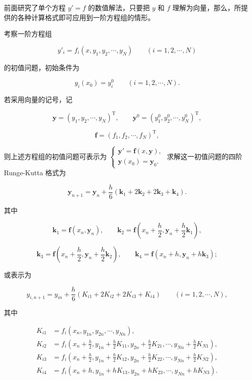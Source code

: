 \documentclass[
  10pt,
  fontset=fandol]{ctexart}
\begin{document}
前面研究了单个方程 \(y'=f\) 的数值解法，只要把 \(y\) 和 \(f\) 理解为向量，那么，所提供的各种计算格式即可应用到一阶方程组的情形。

考察一阶方程组

\[
y'_i=f_i(x,y_1,y_2,\cdots,y_N)\qquad(i=1,2,\cdots,N)
\]

的初值问题，初始条件为

\[
y_i(x_0)=y_i^0\qquad(i=1,2,\cdots,N).
\]

若采用向量的记号，记

\[
\boldsymbol y=(y_1,y_2,\cdots,y_N)^{\mathrm T},\qquad
\boldsymbol y^0=(y_1^0,y_2^0,\cdots,y_N^0)^{\mathrm T},
\]

\[
\boldsymbol f=(f_1,f_2,\cdots,f_N)^{\mathrm T},
\]

则上述方程组的初值问题可表示为 \(\begin{cases}\boldsymbol y'=\boldsymbol f(x,\boldsymbol y),\\\boldsymbol y(x_0)=\boldsymbol y_0.\end{cases}\) 求解这一初值问题的四阶 Runge-Kutta 格式为

\[
\boldsymbol y_{n+1}=\boldsymbol y_n+\frac h6(\boldsymbol k_1+2\boldsymbol k_2+2\boldsymbol k_3+\boldsymbol k_4).
\]

其中

\[
\boldsymbol k_1=\boldsymbol f(x_n,\boldsymbol y_n),\qquad
\boldsymbol k_2=\boldsymbol f\left(x_n+\frac h2,\boldsymbol y_n+\frac h2\boldsymbol k_1\right),
\]

\[
\boldsymbol k_3=\boldsymbol f\left(x_n+\frac h2,\boldsymbol y_n+\frac h2\boldsymbol k_2\right),\qquad
\boldsymbol k_4=\boldsymbol f(x_n+h,\boldsymbol y_n+h\boldsymbol k_3);
\]

或表示为

\[
y_{i,n+1}=y_{in}+\frac h6(K_{i1}+2K_{i2}+2K_{i3}+K_{i4})\qquad(i=1,2,\cdots,N),
\]

其中

\[
\begin{aligned}
K_{i1}&=f_i(x_n,y_{1n},y_{2n},\cdots,y_{Nn}),\\
K_{i2}&=f_i\left(x_n+\frac h2,y_{1n}+\frac h2K_{11},y_{2n}+\frac h2K_{21},\cdots,y_{Nn}+\frac h2K_{N1}\right),\\
K_{i3}&=f_i\left(x_n+\frac h2,y_{1n}+\frac h2K_{12},y_{2n}+\frac h2K_{22},\cdots,y_{Nn}+\frac h2K_{N2}\right),\\
K_{i4}&=f_i(x_n+h,y_{1n}+hK_{13},y_{2n}+hK_{23},\cdots,y_{Nn}+hK_{N3}).
\end{aligned}
\]
\end{document}
